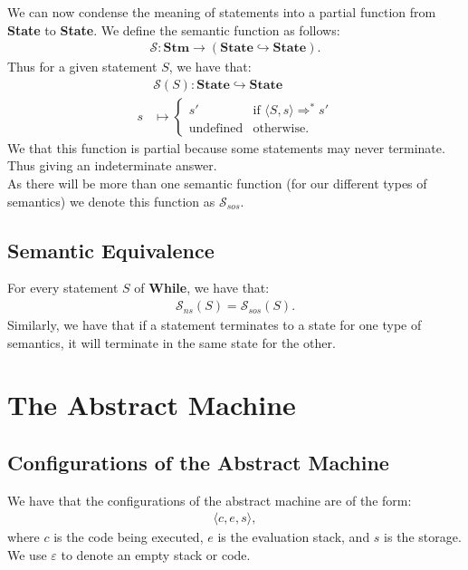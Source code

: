 \documentclass[a4paper, 12pt, twoside]{article}
\begin{document}
We can now condense the meaning of statements into a partial
function from \textbf{State} to \textbf{State}. We define the semantic
function as follows: \begin{gather*}
  \mathcal{S}: \textbf{Stm} \to (\textbf{State} \hookrightarrow \textbf{State}).
\end{gather*} Thus for a given statement $S$, we have that: \begin{align*}
  &\mathcal{S}(S) : \textbf{State} \hookrightarrow \textbf{State} \\
  s &\mapsto \begin{cases}
    s' & \text{if } \langle S, s \rangle \Rightarrow^* s' \\
    \text{undefined} & \text{otherwise}.
  \end{cases}
\end{align*} We that this function is partial because some statements
may never terminate. Thus giving an indeterminate answer.
\\[\baselineskip]
As there will be more than one semantic function (for our different types
of semantics) we denote this function as $\mathcal{S}_{sos}$.

\subsection{Semantic Equivalence}

For every statement $S$ of \textbf{While}, we have that: \begin{gather*}
  \mathcal{S}_{ns}(S) = \mathcal{S}_{sos}(S).
\end{gather*} Similarly, we have that if a statement terminates to a state
for one type of semantics, it will terminate in the same state for the other.

\section{The Abstract Machine}

\subsection{Configurations of the Abstract Machine}

We have that the configurations of the abstract machine are of the 
form: \begin{gather*}
  \langle c, e, s \rangle,
\end{gather*} where $c$ is the code being executed, $e$ is the
evaluation stack, and $s$ is the storage. We use $\varepsilon$ to 
denote an empty stack or code.
\end{document}
